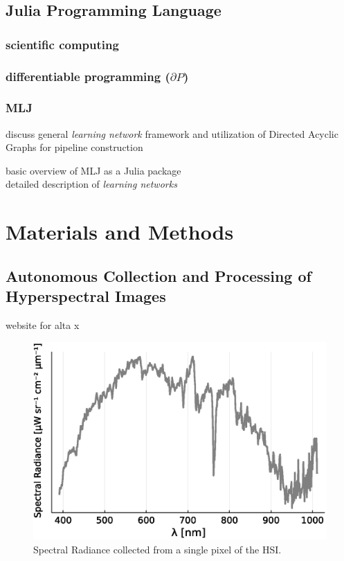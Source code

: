 \documentclass[remotesensing,article,submit,pdftex,moreauthors]{Definitions/mdpi}
\begin{document}
\subsection{Julia Programming Language}
\subsubsection{scientific computing}
\subsubsection{differentiable programming ($\partial P$)}
\subsubsection{MLJ}
discuss general \textit{learning network} framework and utilization of
Directed Acyclic Graphs for pipeline construction

basic overview of MLJ as a Julia package \cite{MLJ1}\\ 

detailed description of \textit{learning networks} \cite{MLJ2}


\section{Materials and Methods}
\subsection{Autonomous Collection and Processing of Hyperspectral Images}

website for alta x \cite{freeflyAltaX}


\begin{figure}[H]
\includegraphics[width=10.5 cm]{images/spectra/radiance.eps}
\caption{Spectral Radiance collected from a single pixel of the HSI.\label{radiancePlot}}
\end{figure}   
\end{document}
